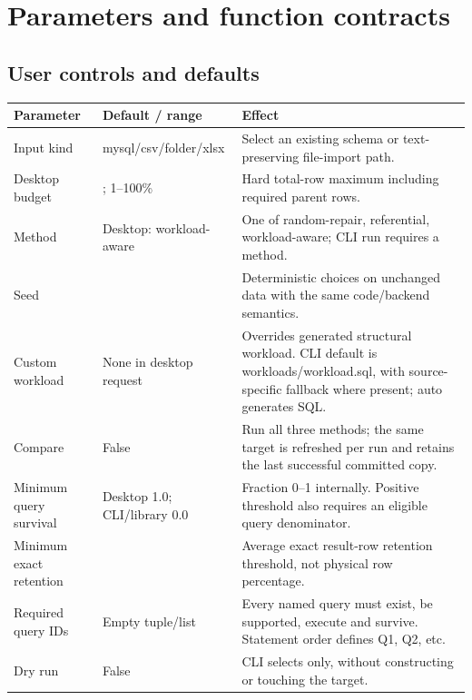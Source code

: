 \documentclass[11pt,a4paper,oneside]{report}
\begin{document}
\chapter{Parameters and function contracts}
\section{User controls and defaults}
\begin{longtable}{>{\RaggedRight\arraybackslash}p{.26\linewidth}>{\RaggedRight\arraybackslash}p{.24\linewidth}>{\RaggedRight\arraybackslash}p{.42\linewidth}}
\toprule\textbf{Parameter} & \textbf{Default / range} & \textbf{Effect}\\\midrule\endhead
Input kind & mysql/csv/folder/xlsx & Select an existing schema or text-preserving file-import path.\\[4pt]
Desktop budget & 10; 1--100\% & Hard total-row maximum including required parent rows.\\[4pt]
Method & Desktop: workload-aware & One of random-repair, referential, workload-aware; CLI run requires a method.\\[4pt]
Seed & 42 & Deterministic choices on unchanged data with the same code/backend semantics.\\[4pt]
Custom workload & None in desktop request & Overrides generated structural workload. CLI default is workloads/workload.sql, with source-specific fallback where present; auto generates SQL.\\[4pt]
Compare & False & Run all three methods; the same target is refreshed per run and retains the last successful committed copy.\\[4pt]
Minimum query survival & Desktop 1.0; CLI/library 0.0 & Fraction 0--1 internally. Positive threshold also requires an eligible query denominator.\\[4pt]
Minimum exact retention & 0.0 & Average exact result-row retention threshold, not physical row percentage.\\[4pt]
Required query IDs & Empty tuple/list & Every named query must exist, be supported, execute and survive. Statement order defines Q1, Q2, etc.\\[4pt]
Dry run & False & CLI selects only, without constructing or touching the target.\\\bottomrule
\end{longtable}
\end{document}
